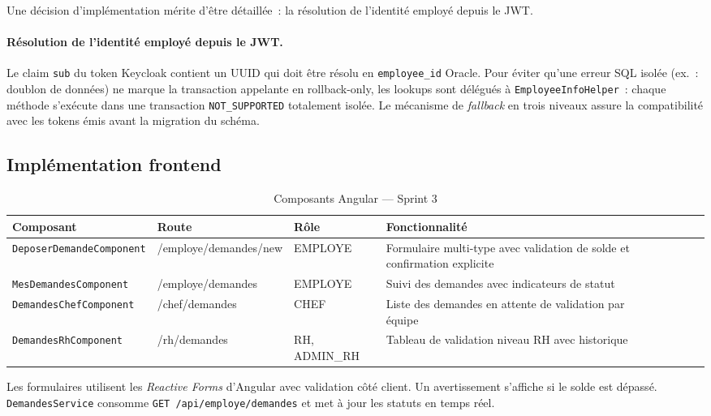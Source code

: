 Une décision d'implémentation mérite d'être détaillée~: la résolution de
l'identité employé depuis le JWT.

\paragraph{Résolution de l'identité employé depuis le JWT.}
Le claim \texttt{sub} du token Keycloak contient un UUID qui doit être résolu en
\texttt{employee\_id} Oracle. Pour éviter qu'une erreur SQL isolée (ex.~: doublon
de données) ne marque la transaction appelante en rollback-only, les lookups sont
délégués à \texttt{EmployeeInfoHelper}~: chaque méthode s'exécute dans une
transaction \texttt{NOT\_SUPPORTED} totalement isolée. Le mécanisme de
\textit{fallback} en trois niveaux assure la compatibilité avec les tokens émis
avant la migration du schéma.

\subsection{Implémentation frontend}

\begin{table}[H]
\centering
\caption{Composants Angular — Sprint 3}
\label{tab:angular_sprint3}
\begin{tabularx}{\textwidth}{VlVlVlVLV}
\hline
\textbf{Composant} & \textbf{Route} & \textbf{Rôle} & \textbf{Fonctionnalité} \\
\hline
\texttt{DeposerDemandeComponent} & /employe/demandes/new & EMPLOYE & Formulaire multi-type avec validation de solde et confirmation explicite \\
\hline
\texttt{MesDemandesComponent} & /employe/demandes & EMPLOYE & Suivi des demandes avec indicateurs de statut \\
\hline
\texttt{DemandesChefComponent} & /chef/demandes & CHEF & Liste des demandes en attente de validation par équipe \\
\hline
\texttt{DemandesRhComponent} & /rh/demandes & RH, ADMIN\_RH & Tableau de validation niveau RH avec historique \\
\hline
\end{tabularx}
\end{table}

Les formulaires utilisent les \textit{Reactive Forms} d’Angular avec validation côté client.
Un avertissement s’affiche si le solde est dépassé. \texttt{DemandesService} consomme
\texttt{GET /api/employe/demandes} et met à jour les statuts en temps réel.

